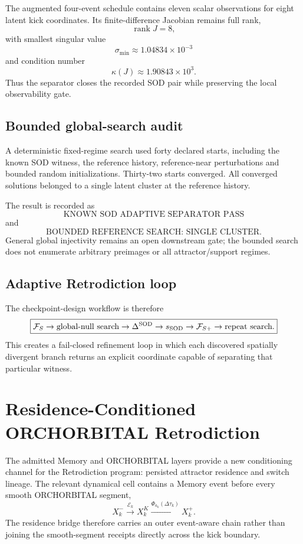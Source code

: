 The augmented four-event schedule contains eleven scalar observations for eight latent kick coordinates. Its finite-difference Jacobian remains full rank,
\[
\operatorname{rank}J=8,
\]
with smallest singular value
\[
\sigma_{\min}\approx1.04834\times10^{-3}
\]
and condition number
\[
\kappa(J)\approx1.90843\times10^3.
\]
Thus the separator closes the recorded SOD pair while preserving the local observability gate.

\section{Bounded global-search audit}

A deterministic fixed-regime search used forty declared starts, including the known SOD witness, the reference history, reference-near perturbations and bounded random initializations. Thirty-two starts converged. All converged solutions belonged to a single latent cluster at the reference history.

The result is recorded as
\[
\boxed{\text{KNOWN SOD ADAPTIVE SEPARATOR PASS}}
\]
and
\[
\boxed{\text{BOUNDED REFERENCE SEARCH: SINGLE CLUSTER}}.
\]
General global injectivity remains an open downstream gate; the bounded search does not enumerate arbitrary preimages or all attractor/support regimes.

\section{Adaptive Retrodiction loop}

The checkpoint-design workflow is therefore
\[
\boxed{
\mathcal F_S
\rightarrow \text{global-null search}
\rightarrow \Delta^{\rm SOD}
\rightarrow s_{\rm SOD}
\rightarrow \mathcal F_{S+}
\rightarrow \text{repeat search}.
}
\]
This creates a fail-closed refinement loop in which each discovered spatially divergent branch returns an explicit coordinate capable of separating that particular witness.


\chapter{Residence-Conditioned ORCHORBITAL Retrodiction}

The admitted Memory and ORCHORBITAL layers provide a new conditioning channel for the Retrodiction program: persisted attractor residence and switch lineage. The relevant dynamical cell contains a Memory event before every smooth ORCHORBITAL segment,
\[
X_k^-
\xrightarrow{\mathcal E_k}
X_k^{K}
\xrightarrow{\Phi_{a_k}(\Delta\tau_k)}
X_k^+.
\]
The residence bridge therefore carries an outer event-aware chain rather than joining the smooth-segment receipts directly across the kick boundary.

